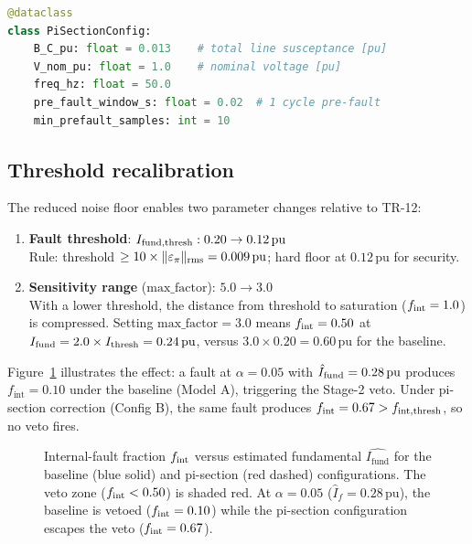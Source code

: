\documentclass[11pt,a4paper]{article}
\newcommand{\Ifund}{I_{\mathrm{fund}}}
\newcommand{\fint}{f_{\mathrm{int}}}
\newcommand{\eps}{\varepsilon}
\newcommand{\pu}{\,\text{pu}}
\begin{document}
\begin{lstlisting}[language=Python]
@dataclass
class PiSectionConfig:
    B_C_pu: float = 0.013    # total line susceptance [pu]
    V_nom_pu: float = 1.0    # nominal voltage [pu]
    freq_hz: float = 50.0
    pre_fault_window_s: float = 0.02  # 1 cycle pre-fault
    min_prefault_samples: int = 10
\end{lstlisting}

\subsection{Threshold recalibration}

The reduced noise floor enables two parameter changes relative to TR-12:

\begin{enumerate}
  \item \textbf{Fault threshold}: $I_{\rm fund,thresh}: 0.20 \to 0.12\pu$\\
        Rule: threshold $\geq 10 \times \|\eps_{\pi}\|_{\rm rms} = 0.009\pu$;
        hard floor at $0.12\pu$ for security.
  \item \textbf{Sensitivity range} ($\mathrm{max\_factor}$): $5.0 \to 3.0$\\
        With a lower threshold, the distance from threshold to saturation
        ($f_{\rm int} = 1.0$) is compressed.
        Setting $\mathrm{max\_factor} = 3.0$ means $f_{\rm int} = 0.50$
        at $I_{\rm fund} = 2.0 \times I_{\rm thresh} = 0.24\pu$, versus
        $3.0 \times 0.20 = 0.60\pu$ for the baseline.
\end{enumerate}

Figure~\ref{fig:fint} illustrates the effect: a fault at $\alpha = 0.05$ with
$\hat{I}_{\rm fund} = 0.28\pu$ produces $\fint = 0.10$ under the baseline
(Model A), triggering the Stage-2 veto.  Under pi-section correction (Config B),
the same fault produces $\fint = 0.67 > f_{\rm int,thresh}$, so no veto fires.

\begin{figure}[h]
  \centering
  
  \caption{Internal-fault fraction $f_{\rm int}$ versus estimated
           fundamental $\hat{\Ifund}$ for the baseline (blue solid) and
           pi-section (red dashed) configurations.  The veto zone
           ($f_{\rm int} < 0.50$) is shaded red.  At $\alpha=0.05$
           ($\hat{I}_f = 0.28\pu$), the baseline is vetoed ($f_{\rm int}=0.10$)
           while the pi-section configuration escapes the veto
           ($f_{\rm int}=0.67$).}
  \label{fig:fint}
\end{figure}
\end{document}
